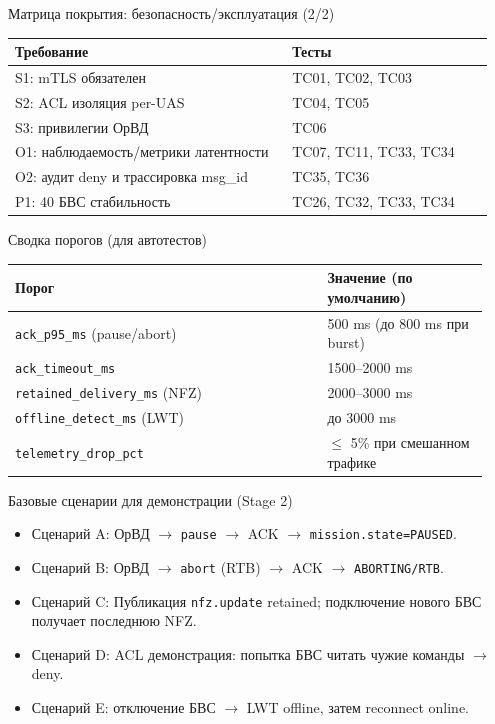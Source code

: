 \documentclass[aspectratio=169]{beamer}
\begin{document}
\begin{frame}[fragile]{Матрица покрытия: безопасность/эксплуатация (2/2)}
\small
\begin{tabular}{@{}p{0.55\linewidth}p{0.40\linewidth}@{}}
\toprule
Требование & Тесты \\
\midrule
S1: mTLS обязателен & TC01, TC02, TC03 \\
S2: ACL изоляция per-UAS & TC04, TC05 \\
S3: привилегии ОрВД & TC06 \\
O1: наблюдаемость/метрики латентности & TC07, TC11, TC33, TC34 \\
O2: аудит deny и трассировка msg\_id & TC35, TC36 \\
P1: 40 БВС стабильность & TC26, TC32, TC33, TC34 \\
\bottomrule
\end{tabular}
\end{frame}

\begin{frame}[fragile]{Сводка порогов (для автотестов)}
\small
\begin{tabular}{@{}p{0.62\linewidth}p{0.32\linewidth}@{}}
\toprule
Порог & Значение (по умолчанию) \\
\midrule
\texttt{ack\_p95\_ms} (pause/abort) & 500 ms (до 800 ms при burst) \\
\texttt{ack\_timeout\_ms} & 1500--2000 ms \\
\texttt{retained\_delivery\_ms} (NFZ) & 2000--3000 ms \\
\texttt{offline\_detect\_ms} (LWT) & до 3000 ms \\
\texttt{telemetry\_drop\_pct} & $\le$ 5\% при смешанном трафике \\
\bottomrule
\end{tabular}
\end{frame}

\begin{frame}[fragile]{Базовые сценарии для демонстрации (Stage 2)}
\begin{itemize}
  \item Сценарий A: ОрВД $\rightarrow$ \texttt{pause} $\rightarrow$ ACK $\rightarrow$ \texttt{mission.state=PAUSED}.
  \item Сценарий B: ОрВД $\rightarrow$ \texttt{abort} (RTB) $\rightarrow$ ACK $\rightarrow$ \texttt{ABORTING/RTB}.
  \item Сценарий C: Публикация \texttt{nfz.update} retained; подключение нового БВС получает последнюю NFZ.
  \item Сценарий D: ACL демонстрация: попытка БВС читать чужие команды $\rightarrow$ deny.
  \item Сценарий E: отключение БВС $\rightarrow$ LWT offline, затем reconnect online.
\end{itemize}
\end{frame}
\end{document}
